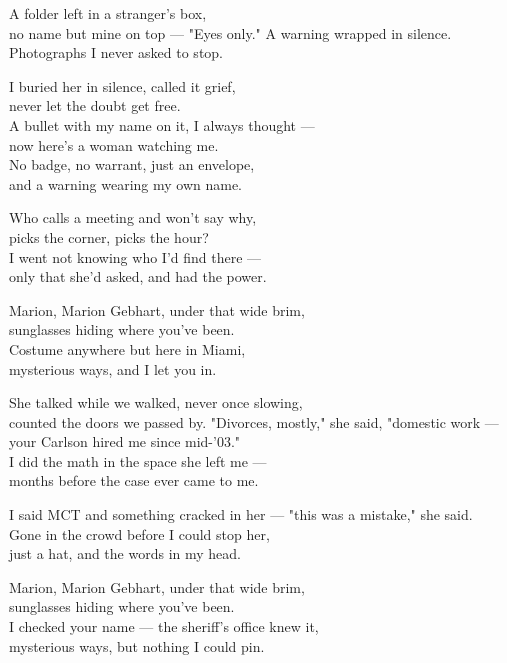 \begin{lyrics}
A folder left in a stranger's box,\\
no name but mine on top —
"Eyes only." A warning wrapped in silence.\\
Photographs I never asked to stop.

I buried her in silence, called it grief,\\
never let the doubt get free.\\
A bullet with my name on it, I always thought —\\
now here's a woman watching me.\\
No badge, no warrant, just an envelope,\\
and a warning wearing my own name.

Who calls a meeting and won't say why,\\
picks the corner, picks the hour?\\
I went not knowing who I'd find there —\\
only that she'd asked, and had the power.

Marion, Marion Gebhart, under that wide brim,\\
sunglasses hiding where you've been.\\
Costume anywhere but here in Miami,\\
mysterious ways, and I let you in.

She talked while we walked, never once slowing,\\
counted the doors we passed by.
"Divorces, mostly," she said, "domestic work —\\
your Carlson hired me since mid-'03."\\
I did the math in the space she left me —\\
months before the case ever came to me.

I said MCT and something cracked in her —
"this was a mistake," she said.\\
Gone in the crowd before I could stop her,\\
just a hat, and the words in my head.

Marion, Marion Gebhart, under that wide brim,\\
sunglasses hiding where you've been.\\
I checked your name — the sheriff's office knew it,\\
mysterious ways, but nothing I could pin.


\end{lyrics}
